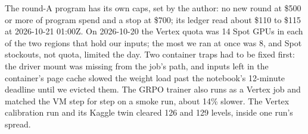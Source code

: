 The round-A program has its own caps, set by the author: no new round at \$500 or more of program spend and a stop at \$700; its ledger read about \$110 to \$115 at 2026-10-21 01:00Z. %
On 2026-10-20 the Vertex quota was 14 Spot GPUs in each of the two regions that hold our inputs; the most we ran at once was 8, and Spot stockouts, not quota, limited the day. %
Two container traps had to be fixed first: the driver mount was missing from the job's path, and inputs left in the container's page cache slowed the weight load past the notebook's 12-minute deadline until we evicted them. %
The GRPO trainer also runs as a Vertex job and matched the VM step for step on a smoke run, about 14\% slower. %
The Vertex calibration run and its Kaggle twin cleared 126 and 129 levels, inside one run's spread. %

